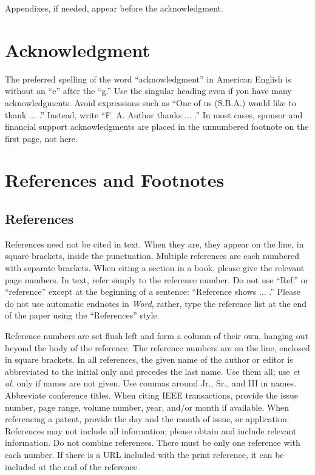\documentclass{ieeeaccess}
\begin{document}
\appendices

Appendixes, if needed, appear before the acknowledgment.

\section*{Acknowledgment}

The preferred spelling of the word ``acknowledgment'' in American English is 
without an ``e'' after the ``g.'' Use the singular heading even if you have 
many acknowledgments. Avoid expressions such as ``One of us (S.B.A.) would 
like to thank $\ldots$ .'' Instead, write ``F. A. Author thanks $\ldots$ .'' In most 
cases, sponsor and financial support acknowledgments are placed in the 
unnumbered footnote on the first page, not here.

\section*{References and Footnotes}

\subsection{References}
References need not be cited in text. When they are, they appear on the 
line, in square brackets, inside the punctuation. Multiple references are 
each numbered with separate brackets. When citing a section in a book, 
please give the relevant page numbers. In text, refer simply to the 
reference number. Do not use ``Ref.'' or ``reference'' except at the 
beginning of a sentence: ``Reference \cite{b3} shows $\ldots$ .'' Please do not use 
automatic endnotes in \emph{Word}, rather, type the reference list at the end of the 
paper using the ``References'' style.

Reference numbers are set flush left and form a column of their own, hanging 
out beyond the body of the reference. The reference numbers are on the line, 
enclosed in square brackets. In all references, the given name of the author 
or editor is abbreviated to the initial only and precedes the last name. Use 
them all; use \emph{et al.} only if names are not given. Use commas around Jr., 
Sr., and III in names. Abbreviate conference titles. When citing IEEE 
transactions, provide the issue number, page range, volume number, year, 
and/or month if available. When referencing a patent, provide the day and 
the month of issue, or application. References may not include all 
information; please obtain and include relevant information. Do not combine 
references. There must be only one reference with each number. If there is a 
URL included with the print reference, it can be included at the end of the 
reference. 
\end{document}
